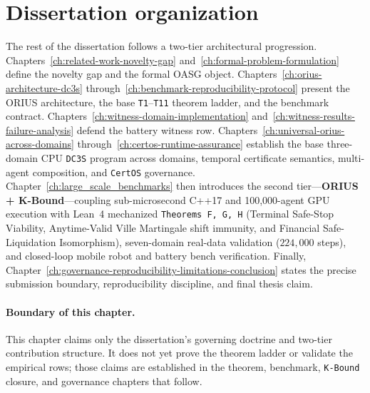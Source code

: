 \section{Dissertation organization}
The rest of the dissertation follows a two-tier architectural progression. Chapters~\ref{ch:related-work-novelty-gap}
and~\ref{ch:formal-problem-formulation} define the novelty gap and the formal OASG object.
Chapters~\ref{ch:orius-architecture-dc3s} through~\ref{ch:benchmark-reproducibility-protocol}
present the ORIUS architecture, the base \texttt{T1}--\texttt{T11} theorem ladder, and the benchmark contract. Chapters~\ref{ch:witness-domain-implementation}
and~\ref{ch:witness-results-failure-analysis} defend the battery witness row. Chapters~\ref{ch:universal-orius-across-domains}
through~\ref{ch:certos-runtime-assurance} establish the base three-domain CPU \texttt{DC3S} program across
domains, temporal certificate semantics, multi-agent composition, and \texttt{CertOS} governance.
Chapter~\ref{ch:large_scale_benchmarks} then introduces the second tier---\textbf{ORIUS + K-Bound}---coupling sub-microsecond C++17 and 100,000-agent GPU execution with Lean~4 mechanized \texttt{Theorems~F, G, H} (Terminal Safe-Stop Viability, Anytime-Valid Ville Martingale shift immunity, and Financial Safe-Liquidation Isomorphism), seven-domain real-data validation ($224,000$ steps), and closed-loop mobile robot and battery bench verification. Finally, Chapter~\ref{ch:governance-reproducibility-limitations-conclusion}
states the precise submission boundary, reproducibility discipline, and final thesis claim.

\paragraph{Boundary of this chapter.}
This chapter claims only the dissertation's governing doctrine and two-tier contribution structure. It
does not yet prove the theorem ladder or validate the empirical rows; those claims are established in
the theorem, benchmark, \texttt{K-Bound} closure, and governance chapters that follow.

